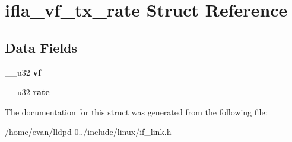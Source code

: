 \section{ifla\-\_\-vf\-\_\-tx\-\_\-rate \-Struct \-Reference}
\label{structifla__vf__tx__rate}
\subsection*{\-Data \-Fields}
\begin{DoxyCompactItemize}
\item 
\-\_\-\-\_\-u32 {\bfseries vf}\label{structifla__vf__tx__rate_ac91d1ffe1c2fd7c6c010563893822165}

\item 
\-\_\-\-\_\-u32 {\bfseries rate}\label{structifla__vf__tx__rate_a5af1f1a0ab13dcbed52e51a009066c9f}

\end{DoxyCompactItemize}


\-The documentation for this struct was generated from the following file\-:\begin{DoxyCompactItemize}
\item 
/home/evan/lldpd-\/0../include/linux/if\-\_\-link.\-h\end{DoxyCompactItemize}
